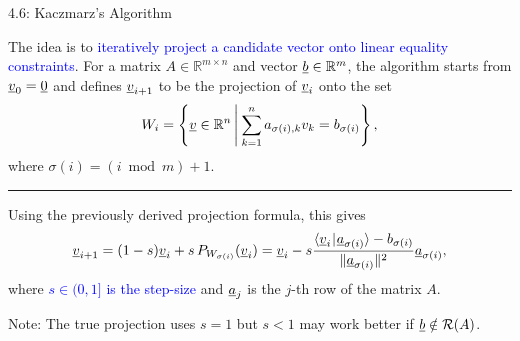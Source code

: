\documentclass[10pt,english,aspectratio=169]{beamer}
\begin{document}
\begin{frame}{4.6: Kaczmarz's Algorithm}

The idea is to \textcolor{blue}{iteratively project a candidate vector onto linear equality constraints}. For a matrix $A\in\mathbb{R}^{m\times n}$ and vector $\underline b\in\mathbb{R}^{m}$, the algorithm starts from $\underline{v}_0 = \underline{0}$ and defines $\underline v_{i+1}$ to be the projection of $\underline v_{i}$ onto the set \vspace{-0.5mm}
\[
W_{i}=\left\{ \underline v\in\mathbb{R}^{n}\,\middle|\:\sum_{k=1}^{n}a_{\sigma(i),k}v_{k}=b_{\sigma(i)}\right\} ,
\]
where $\sigma(i)=(i\bmod m)+1$.
\vspace{3mm}

\hrule

\vspace{3mm}

Using the previously derived projection formula, this gives  \vspace{-0.5mm}
\begin{equation*}
\underline v_{i+1}= (1-s) \underline{v}_i + s \, P_{W_{\sigma(i)}} (\underline{v}_i) = \underline v_{i}- s \frac{{\langle \underline v_{i} \mskip1mu | \mskip1mu \underline a_{\sigma(i)} \rangle}-b_{\sigma(i)}}{\text{\ensuremath{\|}}\underline a_{\sigma(i)}\|^{2}}\underline a_{\sigma(i)},
\end{equation*}
where \textcolor{blue}{$s\in(0,1]$ is the step-size} and $\underline a_{j}$ is the $j$-th row of the matrix $A$. 

\vspace{5mm}
Note: The true projection uses $s=1$ but $s<1$ may work better if $\underline{b} \notin \mathcal{R}(A)$. 
\end{frame}
\end{document}
